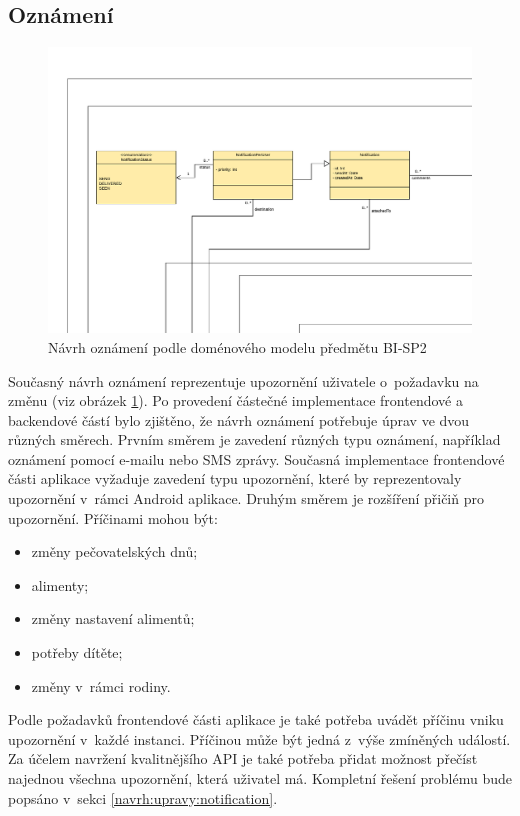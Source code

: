      \subsection{Oznámení}
        \begin{figure}\centering
            \includegraphics[width=1.0\textwidth]{pdfs/Notification1}
            \caption[Předchozí návrh oznámení]{Návrh oznámení podle doménového modelu předmětu BI-SP2}\label{image:notification1}
        \end{figure}
        Současný návrh oznámení reprezentuje upozornění uživatele o~požadavku na změnu (viz obrázek \ref{image:notification1}). Po provedení částečné implementace frontendové a backendové částí bylo zjištěno, že návrh oznámení potřebuje úprav ve dvou různých směrech. Prvním směrem je zavedení různých typu oznámení, například oznámení pomocí e-mailu nebo SMS zprávy. Současná implementace frontendové části aplikace vyžaduje zavedení typu upozornění, které by reprezentovaly upozornění v~rámci Android aplikace. 
        Druhým směrem je rozšíření přičiň pro upozornění. Příčinami mohou být:
        \begin{itemize}
            \setlength\itemsep{0.3em}
            \item změny pečovatelských dnů;
            \item alimenty;
            \item změny nastavení alimentů;
            \item potřeby dítěte;
            \item změny v~rámci rodiny.
        \end{itemize}
        Podle požadavků frontendové části aplikace je také potřeba uvádět příčinu vniku upozornění v~každé instanci. Příčinou může být jedná z~výše zmíněných událostí. Za účelem navržení kvalitnějšího API je také potřeba přidat možnost přečíst najednou všechna upozornění, která uživatel má. Kompletní řešení problému bude popsáno v~sekci \ref{navrh:upravy:notification}.
